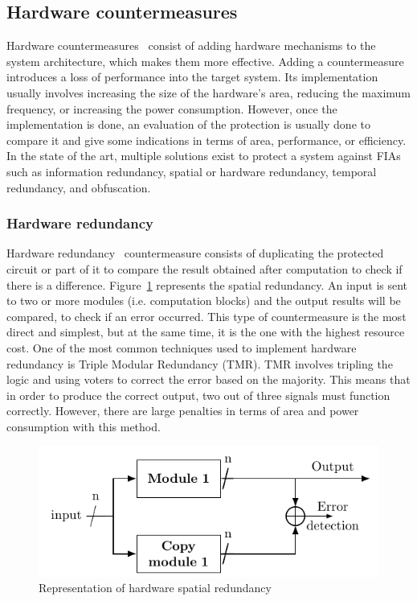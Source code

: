 \subsection{Hardware countermeasures}
Hardware countermeasures~\cite{BCNTW-06-procieee, PTAJC-22-appSci} consist of adding hardware mechanisms to the system architecture, which makes them more effective. Adding a countermeasure introduces a loss of performance into the target system. Its implementation usually involves increasing the size of the hardware's area, reducing the maximum frequency, or increasing the power consumption. However, once the implementation is done, an evaluation of the protection is usually done to compare it and give some indications in terms of area, performance, or efficiency.
In the state of the art, multiple solutions exist to protect a system against FIAs such as information redundancy, spatial or hardware redundancy, temporal redundancy, and obfuscation.

\subsubsection{Hardware redundancy}
Hardware redundancy~\cite{JMR-07-iet, DFR-07-dsn, NDFR-08-ets} countermeasure consists of duplicating the protected circuit or part of it to compare the result obtained after computation to check if there is a difference. Figure~\ref{fig:spatial_redundancy} represents the spatial redundancy. An input is sent to two or more modules (i.e. computation blocks) and the output results will be compared, to check if an error occurred.
This type of countermeasure is the most direct and simplest, but at the same time, it is the one with the highest resource cost.
One of the most common techniques used to implement hardware redundancy is Triple Modular Redundancy (TMR). TMR involves tripling the logic and using voters to correct the error based on the majority. This means that in order to produce the correct output, two out of three signals must function correctly. However, there are large penalties in terms of area and power consumption with this method.

\begin{figure}[ht]
    \centering
    \includegraphics[page=1]{c2_soa/img/redundancy.pdf}
    \caption{Representation of hardware spatial redundancy}
    \label{fig:spatial_redundancy}
\end{figure}

